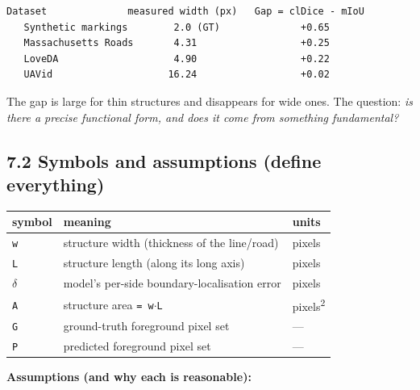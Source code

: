 \documentclass[11pt]{article}
\begin{document}
\begin{Verbatim}[breaklines=true,breakanywhere=true,fontsize=\footnotesize]
   Dataset              measured width (px)   Gap = clDice - mIoU
   Synthetic markings        2.0 (GT)              +0.65
   Massachusetts Roads       4.31                  +0.25
   LoveDA                    4.90                  +0.22
   UAVid                    16.24                  +0.02
\end{Verbatim}

The gap is large for thin structures and disappears for wide ones. The question: \textit{is there a precise functional form, and does it come from something fundamental?}

\subsection*{7.2 Symbols and assumptions (define everything)}

{\footnotesize
\begin{longtable}{|>{\raggedright\arraybackslash}p{5.0cm}|>{\raggedright\arraybackslash}p{5.0cm}|>{\raggedright\arraybackslash}p{5.0cm}|}\hline
\textbf{symbol} & \textbf{meaning} & \textbf{units} \\ \hline
\endhead
\texttt{w} & structure width (thickness of the line/road) & pixels \\ \hline
\texttt{L} & structure length (along its long axis) & pixels \\ \hline
\texttt{$\delta$} & model's per-side boundary-localisation error & pixels \\ \hline
\texttt{A} & structure area \texttt{= w$\cdot$L} & pixels\textsuperscript{2} \\ \hline
\texttt{G} & ground-truth foreground pixel set & --- \\ \hline
\texttt{P} & predicted foreground pixel set & --- \\ \hline
\end{longtable}
}

\textbf{Assumptions (and why each is reasonable):}
\end{document}
